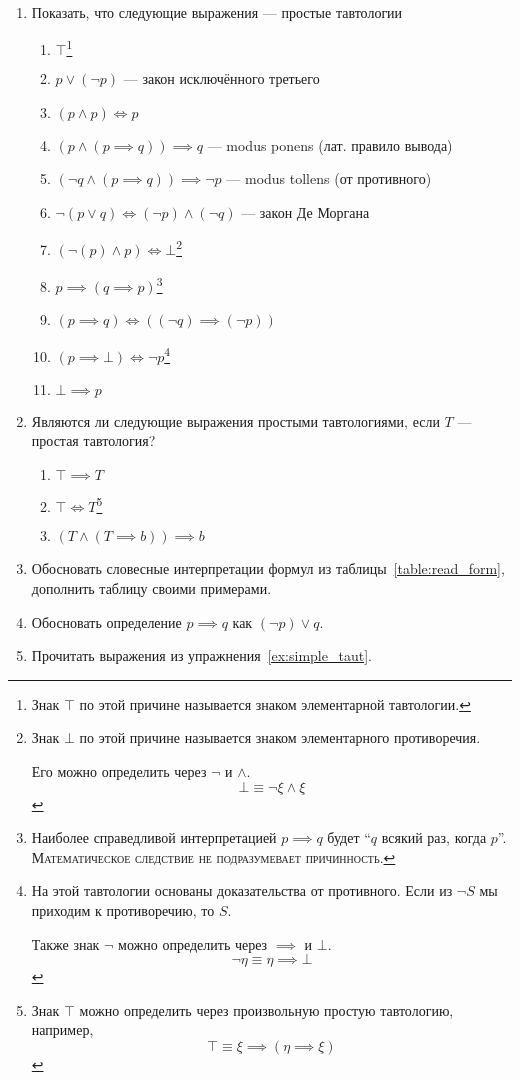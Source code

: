 \begin{enumerate}
	\item{}Показать, что следующие выражения --- простые тавтологии\label{ex:simple_taut}
		\begin{enumerate}
			\item{}$\top$\footnote{Знак $\top$ по этой причине называется
				знаком элементарной тавтологии.}
			\item{}$p\lor (\lnot p)$ --- закон исключённого третьего
			\item{}$(p\land p)\iff p$
			\item{}$(p\land (p\implies q))\implies q$ --- modus ponens (лат. правило вывода)
			\item{}$(\lnot q\land (p\implies q))\implies \lnot p$ --- modus tollens
				(от противного)
			\item{}$\lnot(p\lor q)\iff (\lnot p)\land (\lnot q)$ --- закон Де Моргана
			\item{}$(\lnot(p)\land p)\iff\bot$\footnote[][-10mm]{
					Знак $\bot$ по этой причине называется
					знаком элементарного противоречия.

					Его можно определить через $\lnot$ и $\land$.
					\[
						\bot\equiv \lnot \xi\land \xi
					\]
				}
			\item{}$p\implies (q\implies p)$\footnote{
					Наиболее справедливой интерпретацией ${p\implies q}$ будет
					``$q$ всякий раз, когда $p$''.
					\textsc{Математическое следствие не подразумевает причинность.}
				}
			\item{}${(p\implies q)\iff ((\lnot q)\implies (\lnot p))}$
			\item{}$(p\implies\bot)\iff \lnot p$\footnote[][1mm]{
					На этой тавтологии основаны
					доказательства от противного. Если из $\lnot S$ мы приходим
					к противоречию, то $S$.

					Также знак $\lnot$ можно определить через $\implies$ и $\bot$.
					\[
						\lnot\eta\equiv \eta\implies \bot
					\]
				}
			\item{}$\bot \implies p$
		\end{enumerate}
	\item{}Являются ли следующие выражения простыми тавтологиями,
		если $T$ --- простая тавтология?
		\begin{enumerate}
			\item{}$\top \implies T$
			\item{}$\top \iff T$\footnote{
					Знак $\top$ можно определить через произвольную простую тавтологию,
					например,
					\[
						\top\equiv \xi\implies (\eta\implies \xi)
					\]
				}
			\item{}$(T \land (T\implies b))\implies b$
		\end{enumerate}
	\item{}Обосновать словесные интерпретации формул из таблицы~\ref{table:read_form},
		дополнить таблицу своими примерами.
	\item{}Обосновать определение $p\implies q$ как $(\lnot p)\lor q$.
	\item{}Прочитать выражения из упражнения~\ref{ex:simple_taut}.
\end{enumerate}

